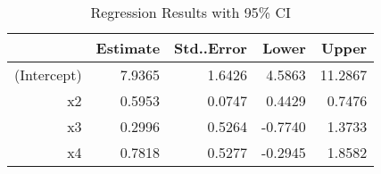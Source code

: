 \begin{table}[ht]
\centering
\caption{Regression Results with 95\% CI} 
\label{tab:regression}
\begin{tabular}{rrrrr}
  \hline
 & Estimate & Std..Error & Lower & Upper \\ 
  \hline
(Intercept) & 7.9365 & 1.6426 & 4.5863 & 11.2867 \\ 
  x2 & 0.5953 & 0.0747 & 0.4429 & 0.7476 \\ 
  x3 & 0.2996 & 0.5264 & -0.7740 & 1.3733 \\ 
  x4 & 0.7818 & 0.5277 & -0.2945 & 1.8582 \\ 
   \hline
\end{tabular}
\end{table}
